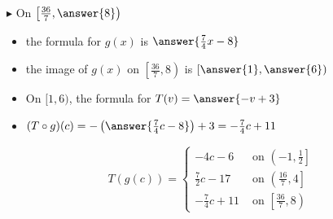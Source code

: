 \documentclass{ximera}
\begin{document}
\begin{explanation}
\begin{itemize}
\end{itemize}












$\blacktriangleright$ On $\left[ \frac{36}{7}, \answer{8} \right)$



\begin{itemize}

\item the formula for $g(x)$ is $\answer{\frac{7}{4}x - 8}$
\item the image of $g(x)$ on $\left[ \frac{36}{7}, 8 \right)$ is $\left[ \answer{1}, \answer{6} \right)$
\item On $[ 1, 6 )$, the formula for $T(v) = \answer{-v + 3}$  \\
\item $(T \circ g)(c) = -\left(\answer{\frac{7}{4}c - 8}\right) + 3 = -\frac{7}{4}c + 11$ \\


\end{itemize}

































\[
T(g(c)) = 
\begin{cases}
  -4c - 6                &       \text{ on }     \left(-1, \frac{1}{2}\right] \\
  \frac{7}{2}c - 17     &     \text{ on }  \left(\frac{16}{7}, 4\right] \\
  -\frac{7}{4}c + 11   &     \text{ on }  \left[\frac{36}{7}, 8\right)
\end{cases}
\]


  

\end{explanation}
\end{document}
